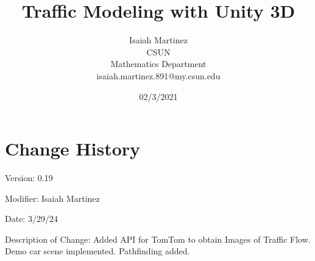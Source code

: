 \documentclass[a4paper,10pt]{article}
\begin{document}
%
    \title{Traffic Modeling with Unity 3D}

    \author{Isaiah Martinez \\ CSUN \\ Mathematics Department \\ isaiah.martinez.891@my.csun.edu}
          
    \date{02/3/2021}

    \maketitle
   
    \tableofcontents
 
    \newpage

    \section{Change History}

    Version: 0.19

    Modifier: Isaiah Martinez
    
    Date: 3/29/24
    
    Description of Change: Added API for TomTom to obtain Images of Traffic Flow.
    Demo car scene implemented.
    Pathfinding added.
    
    

    
\end{document}
